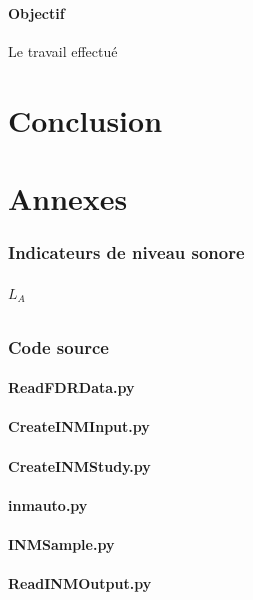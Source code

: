 \documentclass[a4paper]{article}
\begin{document}
    \subsection{Objectif}
    Le travail effectué 
    \newpage
    
    \part{Conclusion}
    \lipsum
    \newpage
    
    \appendix
    \part*{Annexes}
    \section{Indicateurs de niveau sonore}
    \paragraph{$L_{A}$}
    \newpage
    
    \section{Code source}
    \subsection{ReadFDRData.py}
    \subsection{CreateINMInput.py}
    \subsection{CreateINMStudy.py}
    \subsection{inmauto.py}
    \subsection{INMSample.py}
    \subsection{ReadINMOutput.py}
\end{document}
